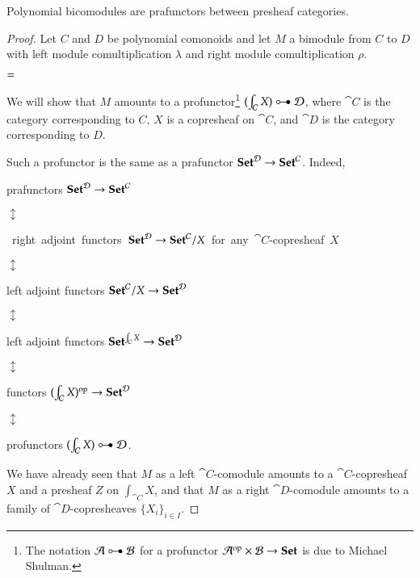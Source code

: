 \documentclass{amsart}
\begin{document}
\begin{prop}
  Polynomial bicomodules are prafunctors between presheaf categories.
\end{prop}
\begin{proof}
  Let $C$ and $D$ be polynomial comonoids and let $M$ a bimodule from
  $C$ to $D$ with left module comultiplication $\lambda$ and right
  module comultiplication $\rho$.
  \begin{center}
    
    \quad
    $=$
    \quad
    
  \end{center}

  We will show that $M$ amounts to a profunctor\footnote{The notation
    $\cat{A} \prof \cat{B}$ for a profunctor
    $\mathcal{A}^{\mathrm{op}} \times \mathcal{B} \to {\normalfont\mathbf{Set}}$ is due to Michael Shulman.}
  $(\int_{\cat{C}} X) \prof \cat{D}$, where $\cat{C}$ is the category
  corresponding to $C$, $X$ is a copresheaf on $\cat{C}$, and
  $\cat{D}$ is the category corresponding to $D$.

  Such a profunctor is the same as a prafunctor
  ${\normalfont\mathbf{Set}}^{\mathcal{D}} \to {\normalfont\mathbf{Set}}^{\mathcal{C}}$. Indeed,
  \begin{center}
    prafunctors ${\normalfont\mathbf{Set}}^{\mathcal{D}} \to {\normalfont\mathbf{Set}}^{\mathcal{C}}$
    
    $\updownarrow$
    
    \vspace{-.2em}\mbox{ right
      adjoint functors ${\normalfont\mathbf{Set}}^{\mathcal{D}} \to {\normalfont\mathbf{Set}}^{\mathcal{C}}/X$
      {\footnotesize for any $\cat{C}$-copresheaf $X$}}
    
    $\updownarrow$
    
    \vspace{-.2em}left adjoint functors ${\normalfont\mathbf{Set}}^{\mathcal{C}}/X \to {\normalfont\mathbf{Set}}^{\mathcal{D}}$
    
    $\updownarrow$
    
    \vspace{-.6em}left adjoint functors ${\normalfont\mathbf{Set}}^{\int_{\mathcal{C}}X} \to {\normalfont\mathbf{Set}}^{\mathcal{D}}$

    $\updownarrow$
    
    functors $(\int_{\mathcal{C}}X)^{\mathrm{op}} \to {\normalfont\mathbf{Set}}^{\mathcal{D}}$

    $\updownarrow$

    profunctors $(\int_{\cat{C}} X) \prof \cat{D}$.
  \end{center}

  We have already seen that $M$ as a left $\cat{C}$-comodule amounts to a
  $\cat{C}$-copresheaf $X$ and a presheaf $Z$ on $\int_{\cat{C}}X$,
  and that $M$ as a right $\cat{D}$-comodule amounts to a family of
  $\cat{D}$-copresheaves $\{X_i\}_{i \in I}$.


\end{proof}
\end{document}
